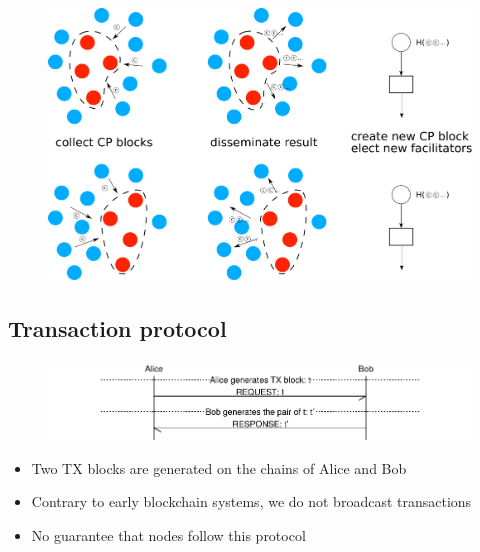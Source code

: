\documentclass{beamer}
\begin{document}
\begin{frame}{\subsecname}
  \begin{figure}
    \includegraphics[width=1.0\textwidth]{consensus-overview}
    \centering
  \end{figure}
\end{frame}

\subsection{Transaction protocol}
\begin{frame}{\subsecname}
  \begin{figure}[h]
  \includegraphics[width=1.0\textwidth]{tx-proto}
  \centering
  \end{figure}
\begin{itemize}
\item Two TX blocks are generated on the chains of Alice and Bob
\item Contrary to early blockchain systems, we do not broadcast transactions
\item No guarantee that nodes follow this protocol
\end{itemize}
\end{frame}
\end{document}
